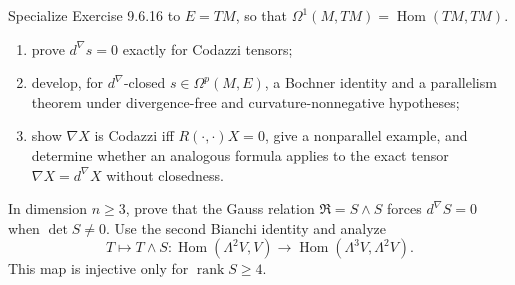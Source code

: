 \begin{remark}
  \label{rem:pet-ch9-exercise-9-6-17}

  Specialize Exercise 9.6.16 to $E=TM$, so that
  $\Omega^1(M,TM)=\operatorname{Hom}(TM,TM)$.
  \begin{enumerate}
    \item[(1)] prove $d^\nabla s=0$ exactly for Codazzi tensors;
    \item[(2)] develop, for $d^\nabla$-closed $s\in\Omega^p(M,E)$, a
      Bochner identity and a parallelism theorem under divergence-free and
      curvature-nonnegative hypotheses;
    \item[(3)] show $\nabla X$ is Codazzi iff
      $R(\cdot,\cdot)X=0$, give a nonparallel example, and determine whether
      an analogous formula applies to the exact tensor $\nabla X=d^\nabla X$
      without closedness.
  \end{enumerate}
\end{remark}

\begin{remark}
  \label{rem:pet-ch9-exercise-9-6-18}

  In dimension $n\ge3$, prove that the Gauss relation
  $\mathfrak R=S\wedge S$ forces $d^\nabla S=0$ when $\det S\ne0$.  Use the
  second Bianchi identity and analyze
  \[
    T\longmapsto T\wedge S:
    \operatorname{Hom}(\Lambda^2V,V)\to\operatorname{Hom}(\Lambda^3V,\Lambda^2V).
  \]
  This map is injective only for $\operatorname{rank}S\ge4$.
\end{remark}
